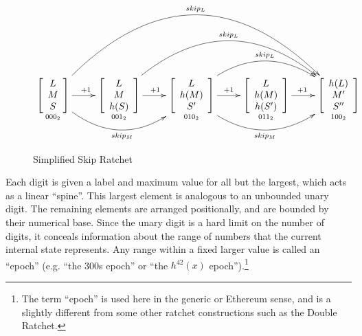 \documentclass[twocolumn]{article}
\begin{document}
	\begin{figure*}[h]
		\centering
		
		$\xymatrix{
		    \underset{000_{2}}{\left[ { \begin{array}{cc} L \\ M  \\ S \end{array} } \right]}
				\ar[r]^{+1}
				\ar@/_3pc/[rr]_{skip_{M}}
				\ar@/^7pc/[rrrr]^{skip_{L}}
    	 & \underset{001_{2}}{\left[ { \begin{array}{cc} L \\ M  \\ h(S) \end{array} } \right]}
	      		\ar[r]^{+1}
	      		\ar@/^4.75pc/[rrr]^{skip_{L}}
	     & \underset{010_{2}}{\left[ { \begin{array}{cc} L \\ h(M)  \\ S' \end{array} } \right]}
	      		\ar[r]^{+1}
	      		\ar@/_3pc/[rr]_{skip_{M}}
	      		\ar@/^3pc/[rr]^{skip_{L}}
    	 & \underset{011_{2}}{\left[ { \begin{array}{cc} L \\ h(M)  \\ h(S') \end{array} } \right]}
	      		\ar[r]^{+1}
	     & \underset{100_{2}}{\left[ { \begin{array}{cc} h(L) \\ M'  \\ S'' \end{array} } \right]}
		}$

		\caption{Simplified Skip Ratchet}
		\label{fig:compound-ratchet}
	\end{figure*}

	Each digit is given a label and maximum value for all but the largest, which acts as a linear ``spine''. This largest element is analogous to an unbounded unary digit. The remaining elements are arranged positionally, and are bounded by their numerical base. Since the unary digit is a hard limit on the number of digits, it conceals information about the range of numbers that the current internal state represents. Any range within a fixed larger value is called an ``epoch'' (e.g. ``the 300s epoch'' or ``the $h^{42}(x)$ epoch'').\footnote{The term ``epoch'' is used here in the generic or Ethereum\cite{ethereum-yellowpaper} sense, and is a slightly different from some other ratchet constructions such as the Double Ratchet\cite{double-ratchet-modularization}.}
	
\end{document}
